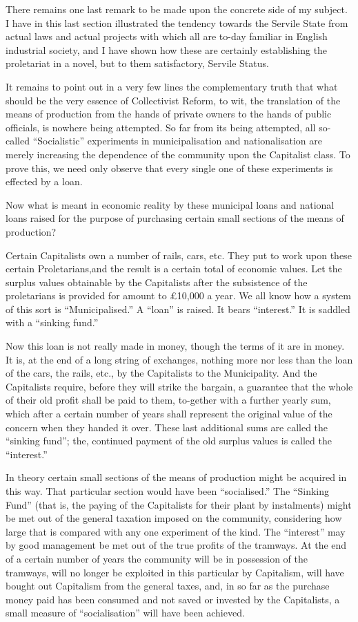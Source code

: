 \documentclass{book}
\begin{document}
There remains one last remark to be made upon the concrete side of my subject. I have in this last section illustrated the tendency towards the Servile State from actual laws and actual projects with which all are to-day familiar in English industrial society, and I have shown how these are certainly establishing the proletariat in a novel, but to them satisfactory, Servile Status.

It remains to point out in a very few lines the complementary truth that what should be the very essence of Collectivist Reform, to wit, the translation of the means of production from the hands of private owners to the hands of public officials, is nowhere being attempted. So far from its being attempted, all so-called “Socialistic” experiments in municipalisation and nationalisation are merely increasing the dependence of the community upon the Capitalist class. To prove this, we need only observe that every single one of these experiments is effected by a loan.

Now what is meant in economic reality by these municipal loans and national loans raised for the purpose of purchasing certain small sections of the means of production?

Certain Capitalists own a number of rails, cars, etc. They put to work upon these certain Proletarians,and the result is a certain total of economic values. Let the surplus values obtainable by the Capitalists after the subsistence of the proletarians is provided for amount to £10,000 a year. We all know how a system of this sort is “Municipalised.” A “loan” is raised. It bears “interest.” It is saddled with a “sinking fund.”

Now this loan is not really made in money, though the terms of it are in money. It is, at the end of a long string of exchanges, nothing more nor less than the loan of the cars, the rails, etc., by the Capitalists to the Municipality. And the Capitalists require, before they will strike the bargain, a guarantee that the whole of their old profit shall be paid to them, to-gether with a further yearly sum, which after a certain number of years shall represent the original value of the concern when they handed it over. These last additional sums are called the “sinking fund”; the, continued payment of the old surplus values is called the “interest.”

In theory certain small sections of the means of production might be acquired in this way. That particular section would have been “socialised.” The “Sinking Fund” (that is, the paying of the Capitalists for their plant by instalments) might be met out of the general taxation imposed on the community, considering how large that is compared with any one experiment of the kind. The “interest” may by good management be met out of the true profits of the tramways. At the end of a certain number of years the community will be in possession of the tramways, will no longer be exploited in this particular by Capitalism, will have bought out Capitalism from the general taxes, and, in so far as the purchase money paid has been consumed and not saved or invested by the Capitalists, a small measure of “socialisation” will have been achieved.
\end{document}
